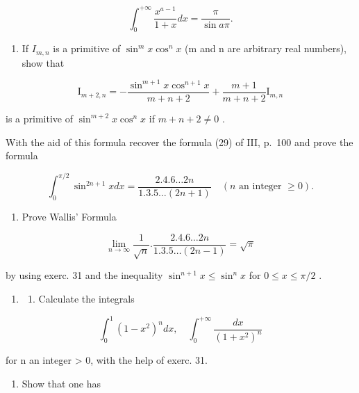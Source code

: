 \[
\int_ {0} ^ {+ \infty} \frac {x ^ {a - 1}}{1 + x} d x = \frac {\pi}{\sin a \pi}.
\]

\begin{enumerate}
\def\labelenumi{\arabic{enumi})}
\setcounter{enumi}{30}
\tightlist
\item
  If \(I_{m,n}\) is a primitive of \(\sin^{m}x\cos^{n}x\) (m and n are arbitrary real numbers), show that
\end{enumerate}

\[
\mathrm{I} _ {m + 2, n} = - \frac {\sin^ {m + 1} x \cos^ {n + 1} x}{m + n + 2} + \frac {m + 1}{m + n + 2} \mathrm{I} _ {m, n}
\]

is a primitive of \(\sin^{m+2}x\cos^{n}x\) if \(m+n+2\neq0\) .

With the aid of this formula recover the formula (29) of III, p.~100 and prove the formula

\[
\int_ {0} ^ {\pi / 2} \sin^ {2 n + 1} x d x = \frac {2 . 4 . 6 \dots 2 n}{1 . 3 . 5 \dots (2 n + 1)} \quad (n \text {   an   integer   } \geqslant 0).
\]

\begin{enumerate}
\def\labelenumi{\arabic{enumi})}
\setcounter{enumi}{31}
\tightlist
\item
  Prove Wallis' Formula
\end{enumerate}

\[
\lim _ {n \rightarrow \infty} \frac {1}{\sqrt {n}}. \frac {2 . 4 . 6 \dots 2 n}{1 . 3 . 5 \dots (2 n - 1)} = \sqrt {\pi}
\]

by using exerc. 31 and the inequality \(\sin^{n+1}x \leqslant \sin^{n}x\) for \(0 \leqslant x \leqslant \pi/2\) .

\begin{enumerate}
\def\labelenumi{\arabic{enumi})}
\setcounter{enumi}{32}
\tightlist
\item
  \begin{enumerate}
  \def\labelenumii{\alph{enumii})}
  \tightlist
  \item
    Calculate the integrals
  \end{enumerate}
\end{enumerate}

\[
\int_ {0} ^ {1} \left(1 - x ^ {2}\right) ^ {n} d x, \quad \int_ {0} ^ {+ \infty} \frac {d x}{\left(1 + x ^ {2}\right) ^ {n}}
\]

for n an integer \textgreater{} 0, with the help of exerc. 31.

\begin{enumerate}
\def\labelenumi{\alph{enumi})}
\setcounter{enumi}{1}
\tightlist
\item
  Show that one has
\end{enumerate}

